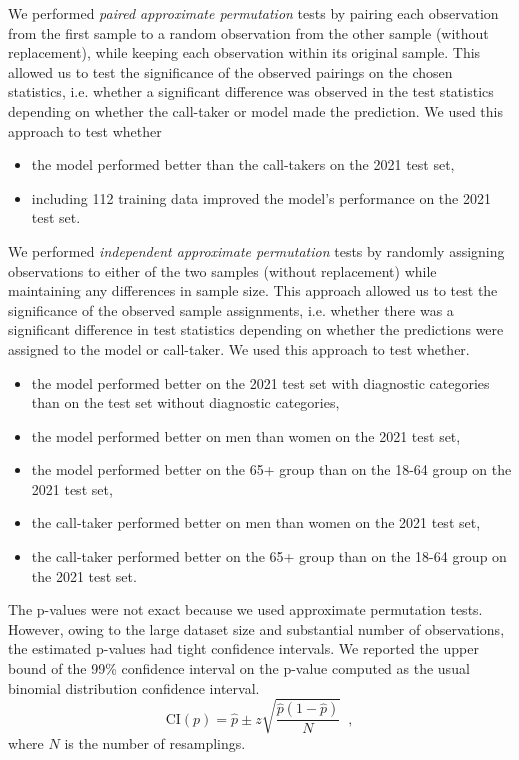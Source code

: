 {We performed \emph{paired approximate permutation} tests by pairing each observation from the first sample to a random observation from the other sample (without replacement), while keeping each observation within its original sample. This allowed us to test the significance of the observed pairings on the chosen statistics, i.e. whether a significant difference was observed in the test statistics depending on whether the call-taker or model made the prediction. We used this approach to test whether
%
\begin{itemize}
    \item the model performed better than the call-takers on the 2021 test set,
    \item including 112 training data improved the model's performance on the 2021 test set.
\end{itemize}
%
We performed \emph{independent approximate permutation} tests by randomly assigning observations to either of the two samples (without replacement) while maintaining any differences in sample size. This approach allowed us to test the significance of the observed sample assignments, i.e. whether there was a significant difference in test statistics depending on whether the predictions were assigned to the model or call-taker. We used this approach to test whether.
%
\begin{itemize}
    \item the model performed better on the 2021 test set with diagnostic categories than on the test set without diagnostic categories,
    \item the model performed better on men than women on the 2021 test set,
    \item the model performed better on the 65+ group than on the 18-64 group on the 2021 test set,
    \item the call-taker performed better on men than women on the 2021 test set,
    \item the call-taker performed better on the 65+ group than on the 18-64 group on the 2021 test set.
\end{itemize}
%
The p-values were not exact because we used approximate permutation tests. However, owing to the large dataset size and substantial number of observations, the estimated p-values had tight confidence intervals. We reported the upper bound of the 99\% confidence interval on the p-value computed as the usual binomial distribution confidence interval.
%
\begin{equation}
    \text{CI}(p) = \hat{p} \pm z \sqrt{\frac{\hat{p}(1-\hat{p})}{N}} \enspace ,
\end{equation}
%
where $N$ is the number of resamplings.

}
